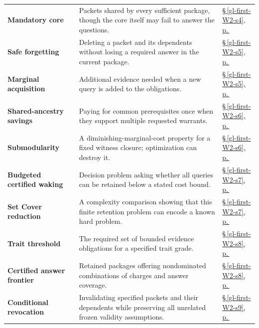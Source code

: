 \documentclass[10pt,letterpaper]{article}
\theoremstyle{definition}
\theoremstyle{remark}
\begin{document}
\begin{longtable}{@{}>{\raggedright\arraybackslash}p{.215\linewidth}>{\raggedright\arraybackslash}p{.585\linewidth}>{\raggedright\arraybackslash}p{.14\linewidth}@{}}
\textbf{Mandatory core} & Packets shared by every sufficient package, though the core itself may fail to answer the questions. & \hyperref[gl-first-W2-s4]{\S\,\ref*{gl-first-W2-s4}, p.\,\pageref*{gl-first-W2-s4}} \\
\textbf{Safe forgetting} & Deleting a packet and its dependents without losing a required answer in the current package. & \hyperref[gl-first-W2-s5]{\S\,\ref*{gl-first-W2-s5}, p.\,\pageref*{gl-first-W2-s5}} \\
\textbf{Marginal acquisition} & Additional evidence needed when a new query is added to the obligations. & \hyperref[gl-first-W2-s5]{\S\,\ref*{gl-first-W2-s5}, p.\,\pageref*{gl-first-W2-s5}} \\
\textbf{Shared-ancestry savings} & Paying for common prerequisites once when they support multiple requested warrants. & \hyperref[gl-first-W2-s6]{\S\,\ref*{gl-first-W2-s6}, p.\,\pageref*{gl-first-W2-s6}} \\
\textbf{Submodularity} & A diminishing-marginal-cost property for a fixed witness closure; optimization can destroy it. & \hyperref[gl-first-W2-s6]{\S\,\ref*{gl-first-W2-s6}, p.\,\pageref*{gl-first-W2-s6}} \\
\textbf{Budgeted certified waking} & Decision problem asking whether all queries can be retained below a stated cost bound. & \hyperref[gl-first-W2-s7]{\S\,\ref*{gl-first-W2-s7}, p.\,\pageref*{gl-first-W2-s7}} \\
\textbf{Set Cover reduction} & A complexity comparison showing that this finite retention problem can encode a known hard problem. & \hyperref[gl-first-W2-s7]{\S\,\ref*{gl-first-W2-s7}, p.\,\pageref*{gl-first-W2-s7}} \\
\textbf{Trait threshold} & The required set of bounded evidence obligations for a specified trait grade. & \hyperref[gl-first-W2-s8]{\S\,\ref*{gl-first-W2-s8}, p.\,\pageref*{gl-first-W2-s8}} \\
\textbf{Certified answer frontier} & Retained packages offering nondominated combinations of charges and answer coverage. & \hyperref[gl-first-W2-s8]{\S\,\ref*{gl-first-W2-s8}, p.\,\pageref*{gl-first-W2-s8}} \\
\textbf{Conditional revocation} & Invalidating specified packets and their dependents while preserving all unrelated frozen validity assumptions. & \hyperref[gl-first-W2-s9]{\S\,\ref*{gl-first-W2-s9}, p.\,\pageref*{gl-first-W2-s9}} \\
\end{longtable}\endgroup
\end{document}
